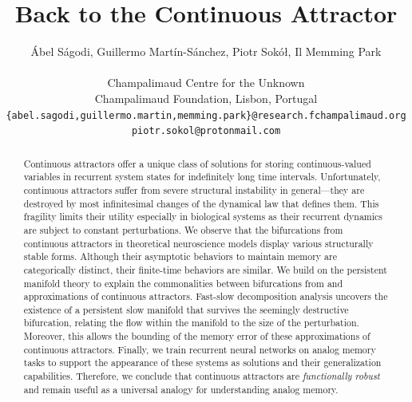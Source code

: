 \documentclass{article} %
\title{Back to the Continuous Attractor}
\author{
    \'Abel S\'agodi, Guillermo Mart\'in-S\'anchez, Piotr Sok\'o\l, Il Memming Park \\
    \\
    Champalimaud Centre for the Unknown\\
    Champalimaud Foundation, Lisbon, Portugal\\
    \texttt{\{abel.sagodi,guillermo.martin,memming.park\}@research.fchampalimaud.org}\\
    \texttt{piotr.sokol@protonmail.com}
}
\newcounter{ct}
\theoremstyle{definition}
\theoremstyle{remark}
\begin{document}


\maketitle

\begin{abstract}
Continuous attractors offer a unique class of solutions for storing continuous-valued variables in recurrent system states for indefinitely long time intervals.
Unfortunately, continuous attractors suffer from severe structural instability in general---they are destroyed by most infinitesimal changes of the dynamical law that defines them.
This fragility limits their utility especially in biological systems as their recurrent dynamics are subject to constant perturbations.
We observe that the bifurcations from continuous attractors in theoretical neuroscience models display various structurally stable forms.
Although their asymptotic behaviors to maintain memory are categorically distinct, their finite-time behaviors are similar.
We build on the persistent manifold theory to explain the commonalities between bifurcations from and approximations of continuous attractors.
Fast-slow decomposition analysis uncovers the existence of a persistent slow manifold that survives the seemingly destructive bifurcation, relating the flow within the manifold to the size of the perturbation. Moreover, this allows the bounding of the memory error of these approximations of continuous attractors.
Finally, we train recurrent neural networks on analog memory tasks to support the appearance of these systems as solutions and their generalization capabilities.
Therefore, we conclude that continuous attractors are \emph{functionally robust} and remain useful as a universal analogy for understanding analog memory.
\end{abstract}
\end{document}
